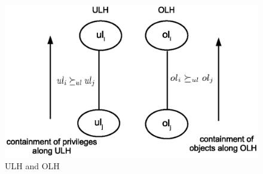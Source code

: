 
 	\begin{figure}
 		\centering
 		\includegraphics[width=.7\textwidth]{ABAC16/direction-of-implication}
 		\caption{ULH and OLH}
 		\label{fig:direction-of-implication}
 	\end{figure}